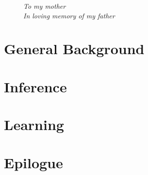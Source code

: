\documentclass[g5paper,phd,electronic]{kthesis}
\begin{document}
\frontmatter
\maketitle
\thispagestyle{empty}
\vfill
\begin{figure}
\begin{flushright}
\Large
\textit{To my mother\\
In loving memory of my father}
\end{flushright}
\end{figure}
\vfill







\tableofcontents

% 
\mainmatter



\part{General Background}
\label{part:background}


\part{Inference}
\label{part:inference}





\part{Learning}
\label{part:learning}









\part{Epilogue}





\end{document}
